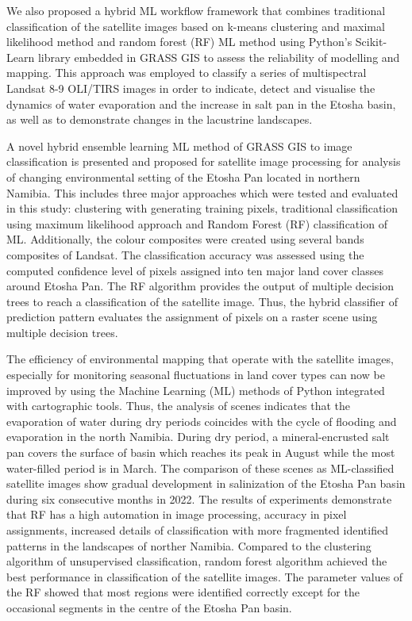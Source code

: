 \documentclass[climate,article,submit,pdftex,moreauthors]{Definitions/mdpi}
\begin{document}
We also proposed a hybrid ML workflow framework that combines traditional classification of the satellite images based on k-means clustering and maximal likelihood method and random forest (RF) ML method using Python's Scikit-Learn library embedded in GRASS GIS to assess the reliability of modelling and mapping. This approach was employed to classify a series of multispectral Landsat 8-9 OLI/TIRS images in order to indicate, detect and visualise the dynamics of water evaporation and the increase in salt pan in the Etosha basin, as well as to demonstrate changes in the lacustrine landscapes. 

A novel hybrid ensemble learning ML method of GRASS GIS to image classification is presented and proposed for satellite image processing for analysis of changing environmental setting of the Etosha Pan located in northern Namibia. This includes three major approaches which were tested and evaluated in this study: clustering with generating training pixels, traditional classification using maximum likelihood approach and Random Forest (RF) classification of ML. Additionally, the colour composites were created using several bands composites of Landsat. The classification accuracy was assessed using the computed confidence level of pixels assigned into ten major land cover classes around Etosha Pan. The RF algorithm provides the output of multiple decision trees to reach a classification of the satellite image. Thus, the hybrid classifier of prediction pattern evaluates the assignment of pixels on a raster scene using multiple decision trees.

The efficiency of environmental mapping that operate with the satellite images, especially for monitoring seasonal fluctuations in land cover types can now be improved by using the Machine Learning (ML) methods of Python integrated with cartographic tools. Thus, the analysis of scenes indicates that the evaporation of water during dry periods coincides with the cycle of flooding and evaporation in the north Namibia. During dry period, a mineral-encrusted salt pan covers the surface of basin which reaches its peak in August while the most water-filled period is in March. The comparison of these scenes as ML-classified satellite images show gradual development in salinization of the Etosha Pan basin during six consecutive months in 2022. The results of experiments demonstrate that RF has a high automation in image processing, accuracy in pixel assignments, increased details of classification with more fragmented identified patterns in the landscapes of norther Namibia. Compared to the clustering algorithm of unsupervised classification, random forest algorithm achieved the best performance in classification of the satellite images. The parameter values of the RF showed that most regions were identified correctly except for the occasional segments in the centre of the Etosha Pan basin.
\end{document}
